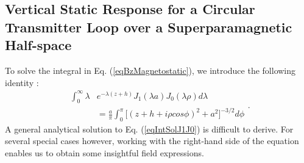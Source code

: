 \documentclass[onecolumn]{IEEEtran} %
\begin{document}

\subsection{Vertical Static Response for a Circular Transmitter Loop over a Superparamagnetic Half-space}
\label{secVertical} To solve the integral in Eq.
(\ref{eqBzMagnetostatic}), we introduce the following identity
\cite{Erdelyi1954}:
\begin{equation}
\begin{split}
\int^{\infty}_0 \lambda &e^{-\lambda (z+h)} J_1(\lambda a) J_0 (\lambda \rho) d \lambda \\
&= \frac{a}{\pi} \int_0^\pi \big [ (z +h + i\rho cos\phi )^2 + a^2 \big ]^{-3/2} d\phi
\end{split}.
\label{eqIntSolJ1J0}
\end{equation}
A general analytical solution to Eq. (\ref{eqIntSolJ1J0}) is
difficult to derive. For several special cases however, working with
the right-hand side of the equation enables us to obtain some
insightful field expressions.
\\\\
\end{document}
